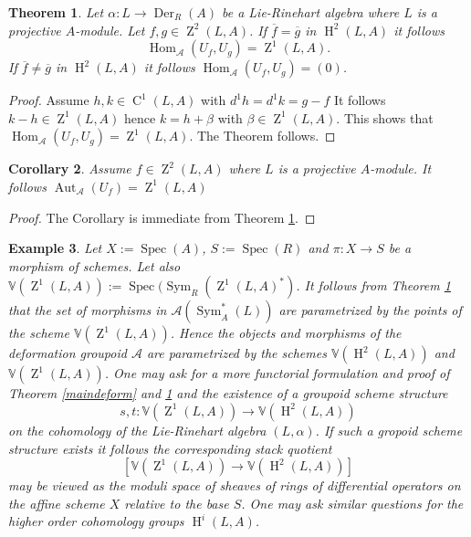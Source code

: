 \documentclass{amsart}
\theoremstyle{plain}
\newtheorem{theorem}{Theorem}[section]
\newtheorem{corollary}[theorem]{Corollary}
\newtheorem{example}[theorem]{Example}
\theoremstyle{definition}
\theoremstyle{remark}
\numberwithin{equation}{theorem}
\begin{document}
\begin{theorem} \label{morphisms} Let $\alpha:L\rightarrow {\operatorname{Der} }_R(A)$ be a Lie-Rinehart algebra 
where $L$ is a projective ${A}$-module. Let $f,g\in {\operatorname{Z}}^2(L,{A})$. 
If $\overline{f}=\overline{g}$ in ${\operatorname{H} }^2(L,{A})$ it follows
\[{\operatorname{Hom} }_{\mathcal{A}}(U_f,U_g)={\operatorname{Z}}^1(L,{A}).\] 
If $\overline{f}\neq \overline{g}$ in ${\operatorname{H} }^2(L,{A})$ it follows
${\operatorname{Hom} }_{\mathcal{A}}(U_f,U_g)=(0)$.
\end{theorem}
\begin{proof} Assume $h,k\in{\operatorname{C} }^1(L,{A})$ with $d^1h=d^1k=g-f$ It follows $k-h\in {\operatorname{Z}}^1(L,{A})$ hence $k=h+\beta$
with $\beta\in {\operatorname{Z}}^1(L,{A})$. This shows that ${\operatorname{Hom} }_{\mathcal{A}}(U_f,U_g)={\operatorname{Z}}^1(L,{A})$. The Theorem follows.
\end{proof}

\begin{corollary} Assume $f\in {\operatorname{Z}}^2(L,{A})$ where $L$ is a projective ${A}$-module. 
It follows ${\operatorname{Aut}}_{\mathcal{A}}(U_f)={\operatorname{Z}}^1(L,{A})$
\end{corollary}
\begin{proof} The Corollary is immediate from Theorem \ref{morphisms}.
\end{proof}

\begin{example} 

Let $X:={\operatorname{Spec} }({A})$, $S:={\operatorname{Spec} }({R})$ and $\pi:X\rightarrow S$ be a morphism of schemes. 
Let also $\mathbb{V}({\operatorname{Z}}^1(L,{A})):={\operatorname{Spec} }({\operatorname{Sym} }_{R}({\operatorname{Z}}^1(L,{A})^*)$. It follows from Theorem \ref{morphisms} that the set 
of morphisms in ${\mathcal{A}} ({\operatorname{Sym} }_{A}^*(L))$ are parametrized by the points of the scheme $\mathbb{V}({\operatorname{Z}}^1(L,{A}))$. Hence
the objects and morphisms of the deformation groupoid ${\mathcal{A}} $ are parametrized by the schemes
$\mathbb{V}({\operatorname{H} }^2(L,{A}))$ and $\mathbb{V}({\operatorname{Z}}^1(L,{A}))$. One may ask for a more functorial formulation and proof of Theorem 
\ref{maindeform} and \ref{morphisms} and the existence of a groupoid scheme structure
\[ s,t: \mathbb{V}({\operatorname{Z}}^1(L,{A}))\rightarrow \mathbb{V}({\operatorname{H} }^2(L,{A})) \]
on the cohomology of the Lie-Rinehart algebra $(L,\alpha)$. If such a gropoid scheme structure exists
it follows the corresponding stack quotient
\[ [\mathbb{V}({\operatorname{Z}}^1(L,{A}))\rightarrow \mathbb{V}({\operatorname{H} }^2(L,{A}))] \]
may be viewed as the moduli space of sheaves of rings of differential operators on the affine scheme 
$X$ relative to the base $S$. One may ask similar questions for the higher order cohomology groups ${\operatorname{H} }^i(L,{A})$.
\end{example}
\end{document}
